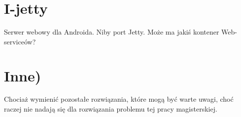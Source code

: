 
\section{I-jetty}
Serwer webowy dla Androida. Niby port Jetty. Może ma jakiś kontener Web-serviceów?

\section{Inne)}
Chociaż wymienić pozostałe rozwiązania, które mogą być warte uwagi, choć raczej nie nadają się dla rozwiązania problemu tej pracy magisterskiej.

%
%
%
%
%

